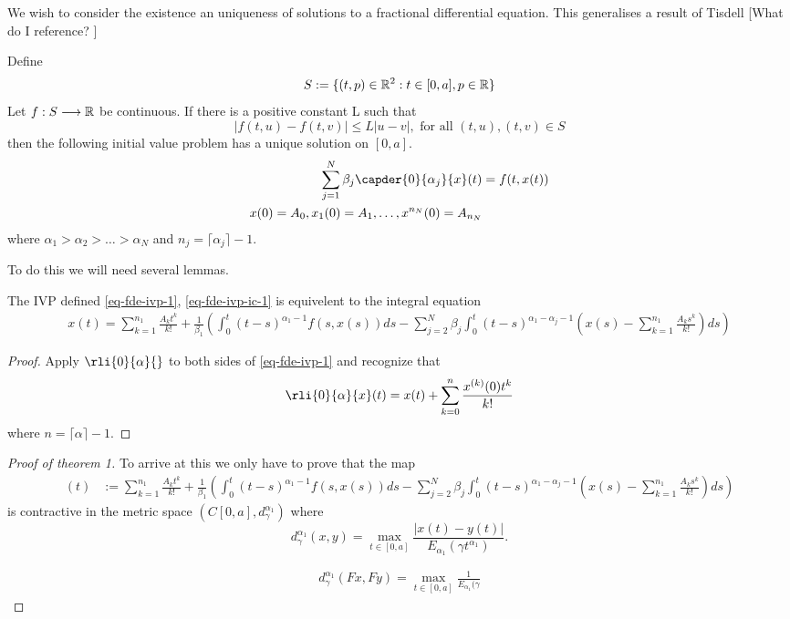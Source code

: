\documentclass{article}
\begin{document}
\setlength\parindent{0pt}
\setlength{\parskip}{5mm plus4mm minus3mm}
\fancyfoot[r]{\today}


We wish to consider the existence an uniqueness of solutions to a fractional differential equation. 
This generalises a result of Tisdell [What do I reference? ]

\label{thm-existence-uniq}
\begin{theorem}
	Define
		$$ S:= \{ (t,p) \in \mathbb{R}^2 : t \in [0, a], p \in \mathbb{R} \} $$
	Let $ f : S \longrightarrow \mathbb{R} $ be continuous. If there is a positive constant L such that 
		$$ |f(t,u) - f(t,v)| \leq L|u-v|, \text{ for all } (t,u), (t,v) \in S $$
	then the following initial value problem has a unique solution on $ [0, a] $.
	\begin{align}
		\label{eq-fde-ivp-1}
		\sum_{j=1}^{N} \beta_j\capder{0}{\alpha_j}{x}(t) &= f(t,x(t)) \\
		\label{eq-fde-ivp-ic-1}
		x(0) = A_0, x_1(0) = A_1, \ldots, x^{n_N}(0) = A_{n_N}
	\end{align}
	where $ \alpha_1 > \alpha_2 > \ldots > \alpha_N $
	and $ n_j = \lceil \alpha_j \rceil - 1 $.
\end{theorem}
To do this we will need several lemmas. 

\begin{lemma}
	The IVP defined \eqref{eq-fde-ivp-1}, \eqref{eq-fde-ivp-ic-1} is equivelent to the integral equation
	\begin{align*}
		x(t) = \sum_{k=1}^{n_1}\frac{A_kt^k}{k!} + \frac{1}{\beta_1} \left( \int_{0}^{t} (t-s)^{\alpha_1 - 1}f(s,x(s))ds - \sum_{j=2}^{N}\beta_j \int_{0}^{t}(t-s)^{\alpha_1 - \alpha_j - 1}\left(x(s) - \sum_{k=1}^{n_1}\frac{A_ks^k}{k!} \right) ds \right)
	\end{align*}
\end{lemma}
\begin{proof}
	Apply $ \rli{0}{\alpha}{} $ to both sides of \eqref{eq-fde-ivp-1} and recognize that
	$$
		\rli{0}{\alpha}{x}(t) = x(t) + \sum_{k=0}^{n} \frac{x^{(k)}(0)t^{k}}{k!}
	$$
	where $ n = \lceil \alpha \rceil - 1 $.
\end{proof}

\begin{proof}[Proof of theorem 1]

	To arrive at this we only have to prove that the map
	\begin{align*}
		[Fx](t) &:= \sum_{k=1}^{n_1}\frac{A_kt^k}{k!} + \frac{1}{\beta_1} \left( \int_{0}^{t} (t-s)^{\alpha_1 - 1}f(s,x(s))ds - \sum_{j=2}^{N}\beta_j \int_{0}^{t}(t-s)^{\alpha_1 - \alpha_j - 1}\left(x(s) - \sum_{k=1}^{n_1}\frac{A_ks^k}{k!} \right) ds \right)
	\end{align*}
	is contractive in the metric space $ \left( C[0,a], d^{\alpha_1}_\gamma \right) $ where 
	$$ d_\gamma^{\alpha_1}(x,y) = \max_{t \in [0, a]} \frac{|x(t) - y(t)|}{E_{\alpha_1}(\gamma t^{\alpha_1})}. $$
	
	\begin{align*}
		d_\gamma^{\alpha_1}(Fx,Fy) = \max_{t \in [0, a]}  \frac{1}{E_{\alpha_1}(\gamma}
	\end{align*}
	
\end{proof}
\end{document}
